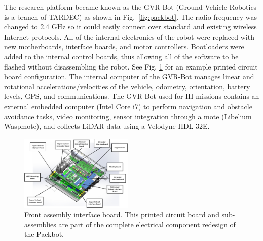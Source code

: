 The research platform became known as the GVR-Bot (Ground Vehicle Robotics is a branch of TARDEC) as shown in Fig.~\ref{fig:packbot}. The radio frequency was changed to 2.4 GHz so it could easily connect over standard and existing wireless Internet protocols. All of the internal electronics of the robot were replaced with new motherboards, interface boards, and motor controllers. Bootloaders were added to the internal control boards, thus allowing all of the software to be flashed without disassembling the robot. See Fig. \ref{fig:pcb} for an example printed circuit board configuration. The internal computer of the GVR-Bot manages linear and rotational accelerations/velocities of the vehicle, odometry, orientation, battery levels, GPS, and communications. The GVR-Bot used for IH missions contains an external embedded computer (Intel Core i7) to perform navigation and obstacle avoidance tasks, video monitoring, sensor integration through a mote (Libelium Waspmote), and collects LiDAR data using a Velodyne HDL-32E.   

\begin{figure}[b]
	\centering
	\includegraphics[width=0.48\textwidth]{./pictures/pcb.png}
	\caption{Front assembly interface board. This printed circuit board and sub-assemblies are part of the complete electrical component redesign of the Packbot.}
	\label{fig:pcb}
\end{figure}


